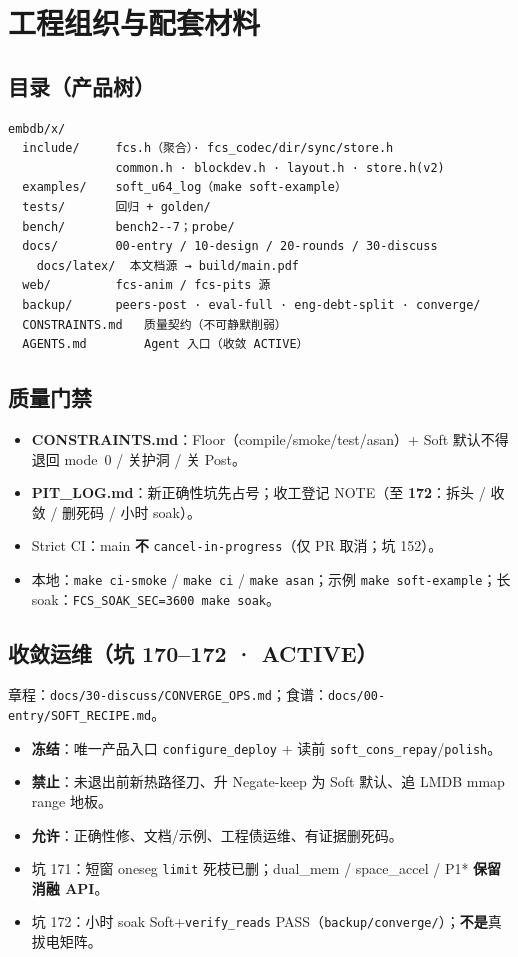 \section{工程组织与配套材料}

\subsection{目录（产品树）}
\begin{verbatim}
embdb/x/
  include/     fcs.h（聚合）· fcs_codec/dir/sync/store.h
               common.h · blockdev.h · layout.h · store.h(v2)
  examples/    soft_u64_log（make soft-example）
  tests/       回归 + golden/
  bench/       bench2--7；probe/
  docs/        00-entry / 10-design / 20-rounds / 30-discuss
    docs/latex/  本文档源 → build/main.pdf
  web/         fcs-anim / fcs-pits 源
  backup/      peers-post · eval-full · eng-debt-split · converge/
  CONSTRAINTS.md   质量契约（不可静默削弱）
  AGENTS.md        Agent 入口（收敛 ACTIVE）
\end{verbatim}

\subsection{质量门禁}
\begin{itemize}[leftmargin=1.6em]
  \item \textbf{CONSTRAINTS.md}：Floor（compile/smoke/test/asan）+ Soft 默认不得退回 mode~0 / 关护洞 / 关 Post。
  \item \textbf{PIT\_LOG.md}：新正确性坑先占号；收工登记 NOTE（至 \textbf{172}：拆头 / 收敛 / 删死码 / 小时 soak）。
  \item Strict CI：main \textbf{不} \texttt{cancel-in-progress}（仅 PR 取消；坑 152）。
  \item 本地：\texttt{make ci-smoke} / \texttt{make ci} / \texttt{make asan}；示例 \texttt{make soft-example}；长 soak：\texttt{FCS\_SOAK\_SEC=3600 make soak}。
\end{itemize}

\subsection{收敛运维（坑 170--172 · ACTIVE）}
章程：\texttt{docs/30-discuss/CONVERGE\_OPS.md}；食谱：\texttt{docs/00-entry/SOFT\_RECIPE.md}。
\begin{itemize}[leftmargin=1.6em]
  \item \textbf{冻结}：唯一产品入口 \texttt{configure\_deploy} + 读前 \texttt{soft\_cons\_repay}/\texttt{polish}。
  \item \textbf{禁止}：未退出前新热路径刀、升 Negate-keep 为 Soft 默认、追 LMDB mmap range 地板。
  \item \textbf{允许}：正确性修、文档/示例、工程债运维、有证据删死码。
  \item 坑 171：短窗 oneseg \texttt{limit} 死枝已删；dual\_mem / space\_accel / P1* \textbf{保留消融 API}。
  \item 坑 172：小时 soak Soft+\texttt{verify\_reads} PASS（\texttt{backup/converge/}）；\textbf{不是}真拔电矩阵。
\end{itemize}


